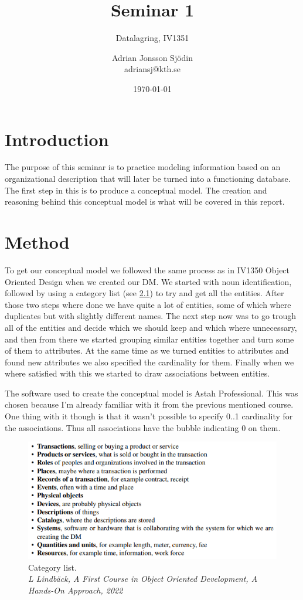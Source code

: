 \documentclass[a4paper]{scrreprt}
\title{Seminar 1}
\subtitle{Datalagring, IV1351}
\author{Adrian Jonsson Sjödin \\ adriansj@kth.se}
\date{\today}
\begin{document}
\maketitle

\tableofcontents %

\chapter{Introduction}
The purpose of this seminar is to practice modeling information based on an organizational description that will later be turned into a functioning database. The first
step in this is to produce a conceptual model. The creation and reasoning behind this conceptual model is what will be covered in this report.

\chapter{Method}
To get our conceptual model we followed the same process as in IV1350 Object Oriented Design when we created our DM. We started
with noun identification, followed by using a category list (see \ref{fig:categoryList}) to try and get all the entities. After those two steps where done
we have quite a lot of entities, some of which where duplicates but with slightly different names. The next step now was
to go trough all of the entities and decide which we should keep and which where unnecessary, and then from there we started
grouping similar entities together and turn some of them to attributes. At the same time as we turned entities to attributes
and found new attributes we also specified the cardinality for them. Finally when we where satisfied with this we started to
draw associations between entities.

The software used to create the conceptual model is Astah Professional. This was chosen because I'm already familiar with it
from the previous mentioned course. One thing with it though is that it wasn't possible to specify 0..1 cardinality for the
associations. Thus all associations have the bubble indicating 0 on them.


\begin{figure}[h]
    \begin{center}
        \includegraphics[width=.9\textwidth]{../img/CategoryList.PNG}
        \caption{Category list. \\ \textit{L Lindbäck, A First Course in Object Oriented Development, A Hands-On Approach, 2022}}
        \label{fig:categoryList}
    \end{center}
\end{figure}
\end{document}
